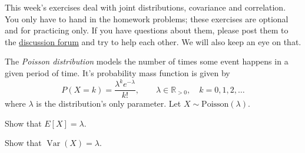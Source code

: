\documentclass[a4paper,10pt,landscape,twocolumn]{scrartcl}
\DeclareMathOperator{\Var}{Var}
\begin{document}
\practiceproblems

{\sffamily\noindent
This week's exercises deal with joint distributions, covariance and correlation. You only have to hand in the homework problems; these exercises are optional and for practicing only. 
If you have questions about them, please post them to the \href{\discussionForumURL}{discussion forum} and try to help each other. We will also keep an eye on that.
}



\begin{exercise}
	The \emph{Poisson distribution} 	models the number of times some event happens in a given period of time. It's probability mass function is given by
	\[
	P(X = k) = {\frac {\lambda ^{k}e^{-\lambda }}{k!}}, \qquad \lambda \in \mathbb{R}_{>0}, \quad k=0,1,2,\dots
	\]
	where $\lambda$ is the distribution's only parameter. Let $X\sim \text{Poisson}(\lambda)$.
	
	\begin{subex}
		Show that $E[X] = \lambda$.
	\end{subex}
	
	\begin{subex}
		Show that $\Var(X) = \lambda$.
	\end{subex}

\end{exercise}
\end{document}
